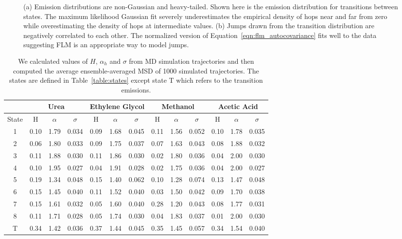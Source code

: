 \documentclass{article}
\begin{document}
\begin{figure}
\begin{subfigure}{0.42\textwidth}
  \caption{}\label{fig:msddm_acf}
  \end{subfigure}
  \caption{(a) Emission distributions are non-Gaussian and heavy-tailed. Shown here is the
  emission distribution for transitions between states. The maximum likelihood
  Gaussian fit severely underestimates the empirical density of hops near and far from zero 
  while overestimating the density of hops at intermediate values. (b) Jumps drawn from
  the transition distribution are negatively correlated to each other. The normalized version 
  of Equation~\ref{eqn:flm_autocovariance} fits well to the data suggesting FLM is
  an appropriate way to model jumps.} \label{fig:msddm_emissions}
  \end{figure}
  
  \begin{table}[h]
  \centering
  \begin{tabular}{|c|c|c|c|c|c|c|c|c|c|c|c|c|}
  \hline
  & \multicolumn{3}{c|}{Urea} & \multicolumn{3}{c|}{Ethylene Glycol} & \multicolumn{3}{c|}{Methanol} & \multicolumn{3}{c|}{Acetic Acid} \\\hline
  State & H     & $\alpha$ & $\sigma$ & H    & $\alpha$ & $\sigma$   & H     & $\alpha$ & $\sigma$ & H    & $\alpha$ & $\sigma$ \\\hline
  1     & 0.10  & 1.79     & 0.034    & 0.09 & 1.68     & 0.045      & 0.11  & 1.56     & 0.052    & 0.10 & 1.78     & 0.035    \\
  2     & 0.06  & 1.80     & 0.033    & 0.09 & 1.75     & 0.037      & 0.07  & 1.63     & 0.043    & 0.08 & 1.88     & 0.032    \\
  3     & 0.11  & 1.88     & 0.030    & 0.11 & 1.86     & 0.030      & 0.02  & 1.80     & 0.036    & 0.04 & 2.00     & 0.030    \\
  4     & 0.10  & 1.95     & 0.027    & 0.04 & 1.91     & 0.028      & 0.02  & 1.75     & 0.036    & 0.04 & 2.00     & 0.027    \\
  5     & 0.19  & 1.34     & 0.048    & 0.15 & 1.40     & 0.062      & 0.10  & 1.28     & 0.074    & 0.13 & 1.47     & 0.048    \\
  6     & 0.15  & 1.45     & 0.040    & 0.11 & 1.52     & 0.040      & 0.03  & 1.50     & 0.042    & 0.09 & 1.70     & 0.038    \\
  7     & 0.15  & 1.61     & 0.032    & 0.05 & 1.60     & 0.040      & 0.28  & 1.20     & 0.043    & 0.08 & 1.77     & 0.031    \\
  8     & 0.11  & 1.71     & 0.028    & 0.05 & 1.74     & 0.030      & 0.04  & 1.83     & 0.037    & 0.01 & 2.00     & 0.030    \\
  T     & 0.34  & 1.42     & 0.036    & 0.37 & 1.44     & 0.045      & 0.35  & 1.45     & 0.057    & 0.34 & 1.54     & 0.040    \\\hline
  \end{tabular}
  \caption{We calculated values of $H$, $\alpha_h$ and $\sigma$ from MD simulation
  trajectories and then computed the average ensemble-averaged MSD of 1000 
  simulated trajectories. The states are defined in Table~\ref{table:states}
  except state T which refers to the transition emissions.}\label{table:msddm_params}
  \end{table}
\end{document}
